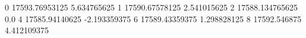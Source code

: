 0 17593.76953125 5.634765625
1 17590.67578125 2.541015625
2 17588.134765625 0.0
4 17585.94140625 -2.193359375
6 17589.43359375 1.298828125
8 17592.546875 4.412109375
